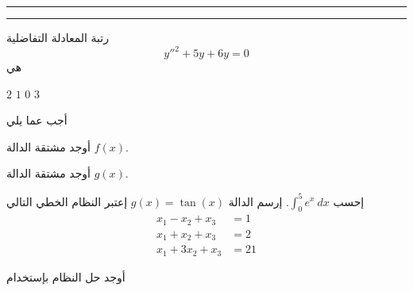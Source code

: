 \documentclass[addpoints,12pt]{exam}
\begin{document}
\pointformat{(\thepoints)}
\pointsinrightmargin
\boxedpoints   %
\hrule
\hrule
\noindent
\fontsize{14pt}{14pt}\selectfont %

\begin{questions}

\question رتبة المعادلة التفاضلية
\begin{equation}\label{ode.1}
  \displaystyle y''^2 + 5y+ 6y = 0
\end{equation} هي

\begin{oneparchoices}
\choice $2$
\choice $1$
\choice $0$
\CorrectChoice $3$
\end{oneparchoices}
\question[4] أجب عما يلي
\begin{parts}
\item أوجد مشتقة الدالة $f(x)$.
\item أوجد مشتقة الدالة $g(x)$.
\end{parts}

\question[6]
إحسب $\displaystyle \int_0^5 e^{x}\: dx$.
\question[5]
إرسم الدالة $g(x)= \tan(x)$
\question
إعتبر النظام الخطي التالي
\begin{align*}
\nonumber   x_1 - x_2 + x_3 &= 1 \\
\nonumber  x_1 + x_2 + x_3&= 2 \\
\nonumber  x_1 + 3x_2 + x_3 &= 21
\end{align*}

أوجد حل النظام بإستخدام


\end{questions}

\begin{center}
\end{center}
\end{document}
